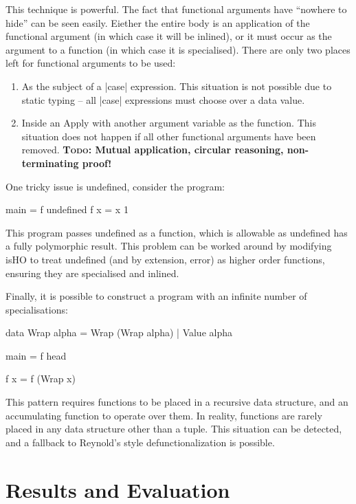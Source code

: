 \documentclass[preprint]{sigplanconf}
\newcommand{\C}[1]{\textsf{#1}}
\newcommand{\todo}[1]{\textbf{\textsc{Todo:} #1}}
\begin{document}
This technique is powerful. The fact that functional arguments have ``nowhere to hide'' can be seen easily. Eiether the entire body is an application of the functional argument (in which case it will be inlined), or it must occur as the argument to a function (in which case it is specialised). There are only two places left for functional arguments to be used:

\begin{enumerate}
\item As the subject of a |case| expression. This situation is not possible due to static typing -- all |case| expressions must choose over a data value.

\item Inside an \C{Apply} with another argument variable as the function. This situation does not happen if all other functional arguments have been removed. \todo{Mutual application, circular reasoning, non-terminating proof!}
\end{enumerate}

One tricky issue is \C{undefined}, consider the program:

\begin{code}
main = f undefined
f x = x 1
\end{code}

This program passes \C{undefined} as a function, which is allowable as \C{undefined} has a fully polymorphic result. This problem can be worked around by modifying \C{isHO} to treat \C{undefined} (and by extension, \C{error}) as higher order functions, ensuring they are specialised and inlined.

Finally, it is possible to construct a program with an infinite number of specialisations:

\begin{code}
data Wrap alpha = Wrap (Wrap alpha) | Value alpha

main = f head

f x = f (Wrap x)
\end{code}

This pattern requires functions to be placed in a recursive data structure, and an accumulating function to operate over them. In reality, functions are rarely placed in any data structure other than a tuple. This situation can be detected, and a fallback to Reynold's style defunctionalization is possible.

\section{Results and Evaluation}
\label{sec:results}
\end{document}
